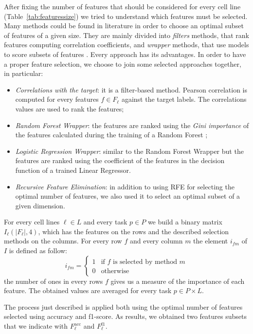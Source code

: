 After fixing the number of features that should be considered for every cell line (Table~\ref{tab:featuressize}) we tried to understand which features must be selected. Many methods could be found in literature in order to choose an optimal subset of features of a given size. They are mainly divided into \emph{filters} methods, that rank features computing correlation coefficients, and \emph{wrapper} methods, that use models to score subsets of features \cite{Guyon}. Every approach has its advantages. In order to have a proper feature selection, we choose to join some selected approaches together, in particular:
\begin{itemize}
    \item \textit{Correlations with the target}: it is a filter-based method. Pearson correlation is computed for every features $f \in F_\ell$ against the target labels. The correlations values are used to rank the features;
    \item \textit{Random Forest Wrapper}: the features are ranked using the \emph{Gini importance} \cite{giniimportance} of the features calculated during the training of a Random Forest \cite{breiman2001random}; 
    \item \textit{Logistic Regression Wrapper}: similar to the Random Forest Wrapper but the features are ranked using the coefficient of the features in the decision function of a trained Linear Regressor.
    \item \emph{Recursive Feature Elimination}: in addition to using RFE for selecting the optimal number of features, we also used it to select an optimal subset of a given dimension. 
\end{itemize}
For every cell lines $\ell \in L$ and every task $p \in P$ we build a binary matrix $I_\ell(|F_\ell|, 4)$, which has the features on the rows and the described selection methods on the columns. For every row $f$ and every column $m$ the element $i_{fm}$ of $I$ is defined as follow: 
\[
    i_{fm} = \begin{cases} 1 & \mbox{if } f \mbox{ is selected by method } m \\ 0 & \mbox{otherwise} \end{cases}
\]
the number of ones in every rows $f$ gives us a measure of the importance of each feature. The obtained values are averaged for every task $p \in P \times L$.

The process just described is applied both using the optimal number of features selected using accuracy and f1-score. As results, we obtained two features subsets that we indicate with $F_\ell^{\textrm{acc}}$ and $F_\ell^{\textrm{f1}}$.

